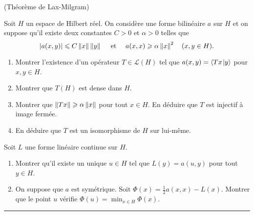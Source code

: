 \documentclass[a4paper,12pt,reqno]{amsart}
\begin{document}
\begin{exo}(Théorème de Lax-Milgram)

  Soit $H$ un espace de Hilbert réel. On considère une forme bilinéaire $a$ sur $H$
  et on suppose qu'il existe deux constantes $C > 0$ et $\alpha > 0$ telles que
  \[
    |a(x,y)| \leq C\norm{x}\norm{y} \quad \mbox{ et } \quad a(x,x) \geq \alpha \norm{x}^2 \quad (x,y\in H).
  \]
  \begin{enumerate}
    \item Montrer l'existence d'un opérateur $T \in \mathcal L(H)$ tel que $a(x,y) = \scalprod{Tx}{y}$ pour $x,y \in H$.
    \item Montrer que $T(H)$ est dense dans $H$.
    \item Montrer que $\norm{Tx} \geq \alpha\norm{x}$ pour tout $x\in H$. En déduire que $T$ est injectif à image fermée.
    \item En déduire que $T$ est un isomorphisme de $H$ sur lui-même.
  \end{enumerate}
  Soit $L$ une forme linéaire continue sur $H$.
  \begin{enumerate}[resume]
    \item Montrer qu'il existe un unique $u\in H$ tel que $L(y) = a(u,y)$ pour tout $y\in H$.
    \item On suppose que $a$ est symétrique. Soit $\Phi(x) = \frac{1}{2}a(x,x) - L(x)$. Montrer que le point $u$ vérifie $\Phi(u) = \min_{x\in H}\Phi(x)$.
  \end{enumerate}
\end{exo}

\hrule


\newcommand*{\norm}[1]{\left\lVert{\ifx\hfuzz#1\hfuzz \,\cdot\,\else#1\fi}\right\rVert} %
\newcommand*{\scalprod}[3][]{#1\langle{#2}\kern1pt #1|{#3}#1\rangle}
\newcommand*{\equivalent}{\Leftrightarrow}
\newcommand*{\Image}[1]{\text{Im} (#1) }

\newcommand{\vertiii}[1]{{\left\vert\kern-0.25ex\left\vert\kern-0.25ex\left\vert #1 
    \right\vert\kern-0.25ex\right\vert\kern-0.25ex\right\vert}}
\end{document}
